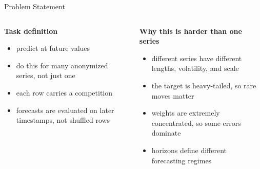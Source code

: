 \begin{frame}[t]{Problem Statement}
  \vspace{0.35em}

  \begin{columns}[T,onlytextwidth]
    \begin{whitecard}
      {\bfseries Task definition}\par
      \vspace{0.25em}
      \small
      \begin{itemize}
        \item predict  at future  values
        \item do this for many anonymized series, not just one
        \item each row carries a competition 
        \item forecasts are evaluated on later timestamps, not shuffled rows
      \end{itemize}
    \end{whitecard}

    \begin{softcard}
      {\bfseries Why this is harder than one series}\par
      \vspace{0.25em}
      \small
      \begin{itemize}
        \item different series have different lengths, volatility, and scale
        \item the target is heavy-tailed, so rare moves matter
        \item weights are extremely concentrated, so some errors dominate
        \item horizons  define different forecasting regimes
      \end{itemize}
    \end{softcard}
  \end{columns}
\end{frame}

